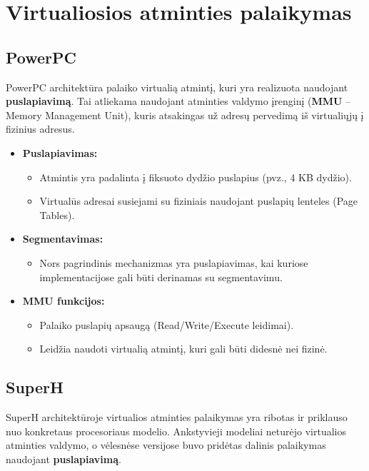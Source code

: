 \documentclass{article}
\begin{document}
\section{Virtualiosios atminties palaikymas}
\subsection{PowerPC}
PowerPC architektūra palaiko virtualią atmintį, kuri yra realizuota naudojant \textbf{puslapiavimą}. Tai atliekama naudojant atminties valdymo įrenginį (\textbf{MMU} – Memory Management Unit), kuris atsakingas už adresų pervedimą iš virtualiųjų į fizinius adresus.

\begin{itemize}
    \item \textbf{Puslapiavimas:}
        \begin{itemize}
            \item Atmintis yra padalinta į fiksuoto dydžio puslapius (pvz., 4 KB dydžio).
            \item Virtualūs adresai susiejami su fiziniais naudojant puslapių lenteles (Page Tables).
        \end{itemize}
    \item \textbf{Segmentavimas:} 
        \begin{itemize}
            \item Nors pagrindinis mechanizmas yra puslapiavimas, kai kuriose implementacijose gali būti derinamas su segmentavimu.
        \end{itemize}
    \item \textbf{MMU funkcijos:}
        \begin{itemize}
            \item Palaiko puslapių apsaugą (Read/Write/Execute leidimai).
            \item Leidžia naudoti virtualią atmintį, kuri gali būti didesnė nei fizinė.
        \end{itemize}
\end{itemize}

\subsection{SuperH}
SuperH architektūroje virtualios atminties palaikymas yra ribotas ir priklauso nuo konkretaus procesoriaus modelio. Ankstyvieji modeliai neturėjo virtualios atminties valdymo, o vėlesnėse versijose buvo pridėtas dalinis palaikymas naudojant \textbf{puslapiavimą}.
\end{document}
